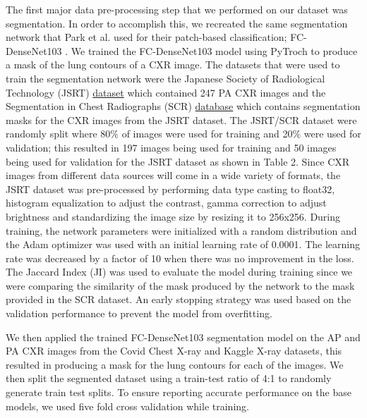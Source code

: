 \documentclass{sigkddExp}
\begin{document}
The first major data pre-processing step that we performed on our dataset was
segmentation. In order to accomplish this, we recreated the same segmentation
network that Park et al. used for their patch-based classification;
FC-DenseNet103 \cite{DBLP:journals/corr/JegouDVRB16}. We trained the
FC-DenseNet103 model using PyTroch to produce a mask of the lung contours of a
CXR image. The datasets that were used to train the segmentation network were
the Japanese Society of Radiological Technology (JSRT)
\href{http://db.jsrt.or.jp/eng.php}{dataset} which contained 247 PA CXR images
and the Segmentation in Chest Radiographs (SCR)
\href{https://www.isi.uu.nl/Research/Databases/SCR/}{database} which contains
segmentation masks for the CXR images from the JSRT dataset. The JSRT/SCR
dataset were randomly split where 80\% of images were used for training and 20\%
were used for validation; this resulted in 197 images being used for training
and 50 images being used for validation for the JSRT dataset as shown in Table
2. Since CXR images from different data sources will come in a wide variety of
formats, the JSRT dataset was pre-processed by performing data type casting to
float32, histogram equalization to adjust the contrast, gamma correction to
adjust brightness and standardizing the image size by resizing it to 256x256.
During training, the network parameters were initialized with a random
distribution and the Adam optimizer was used with an initial learning rate of
0.0001. The learning rate was decreased by a factor of 10 when there was no
improvement in the loss. The Jaccard Index (JI) was used to evaluate the model
during training since we were comparing the similarity of the mask produced by
the network to the mask provided in the SCR dataset. An early stopping strategy
was used based on the validation performance to prevent the model from
overfitting.

We then applied the trained FC-DenseNet103 segmentation model on the AP and PA
CXR images from the Covid Chest X-ray and Kaggle X-ray datasets, this resulted
in producing a mask for the lung contours for each of the images. We then split
the segmented dataset using a train-test ratio of 4:1 to randomly generate train
test splits. To ensure reporting accurate performance on the base models, we
used five fold cross validation while training.
\end{document}
